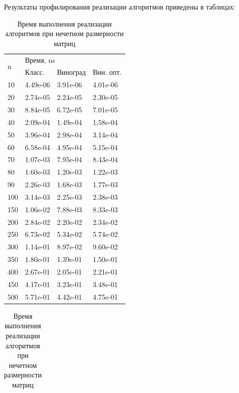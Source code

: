 Результаты профилирования реализации алгоритмов приведены в таблицах: 
\begin{table}[ht!]
	\renewcommand{\arraystretch}{1.4}
	\begin{subtable}[ht!]{0.45\textwidth}
		\centering
		\caption{Время выполнения реализации алгоритмов при четной размерности матриц}
		\begin{tabular}{||l|l|l|l||}
			\hline
			\multirow{2}{*}{n} & \multicolumn{3}{l||}{Время, ns} \\ \cline{2-4} 
			&  Класс. & Виноград & Вин. опт. \\ \hline\hline
			10 & 4.49e-06 & 3.91e-06 & 4.01e-06 \\ \hline 
			20 & 2.74e-05 & 2.24e-05 & 2.30e-05 \\ \hline 
			30 & 8.84e-05 & 6.72e-05 & 7.01e-05 \\ \hline 
			40 & 2.09e-04 & 1.49e-04 & 1.58e-04 \\ \hline 
			50 & 3.96e-04 & 2.98e-04 & 3.14e-04 \\ \hline 
			60 & 6.58e-04 & 4.95e-04 & 5.15e-04 \\ \hline 
			70 & 1.07e-03 & 7.95e-04 & 8.43e-04 \\ \hline 
			80 & 1.60e-03 & 1.20e-03 & 1.22e-03 \\ \hline 
			90 & 2.26e-03 & 1.68e-03 & 1.77e-03 \\ \hline 
			100 & 3.14e-03 & 2.25e-03 & 2.38e-03 \\ \hline 
			150 & 1.06e-02 & 7.88e-03 & 8.33e-03 \\ \hline 
			200 & 2.84e-02 & 2.20e-02 & 2.34e-02 \\ \hline 
			250 & 6.73e-02 & 5.34e-02 & 5.74e-02 \\ \hline 
			300 & 1.14e-01 & 8.97e-02 & 9.60e-02 \\ \hline 
			350 & 1.80e-01 & 1.39e-01 & 1.50e-01 \\ \hline 
			400 & 2.67e-01 & 2.05e-01 & 2.21e-01 \\ \hline 
			450 & 4.17e-01 & 3.23e-01 & 3.48e-01 \\ \hline 
			500 & 5.71e-01 & 4.42e-01 & 4.75e-01 \\ \hline 
		\end{tabular}
		\label{tab:odd}
	\end{subtable}
	\hfill
	\begin{subtable}[ht!]{0.45\textwidth}
		\centering
		\caption{Время выполнения реализации алгоритмов при нечетном размерности матриц}
		\begin{tabular}{||l|l|l|l||}

\end{tabular}
\end{subtable}
\end{table}
